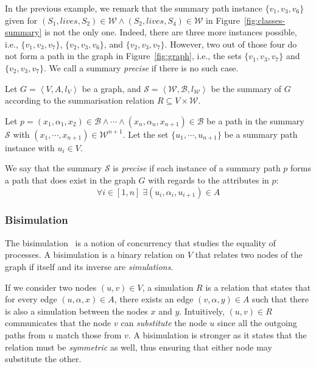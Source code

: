 In the previous example, we remark that the summary path instance $\{v_1, v_3, v_6\}$ given for $(S_1, lives, S_2) \in \mathcal{W} \wedge (S_2, lives, S_4) \in \mathcal{W}$ in Figure~\ref{fig:classes-summary} is not the only one. Indeed, there are three more instances possible, i.e., $\{v_1, v_3, v_7\}$, $\{v_2, v_3, v_6\}$, and $\{v_2, v_3, v_7\}$. However, two out of those four do not form a path in the graph in Figure~\ref{fig:graph}, i.e., the sets $\{v_1, v_3, v_7\}$ and $\{v_2, v_3, v_7\}$. We call a summary \emph{precise} if there is no such case.

\begin{definition}
\label{def:precise-summary}
Let $G=\left\langle V, A, l_V \right\rangle$ be a graph, and $\mathcal{S} = \left\langle \mathcal{W}, \mathcal{B}, l_{\mathcal{W}} \right\rangle$ be the summary of $G$ according to the summarisation relation $R \subseteq V \times \mathcal{W}$.

Let $p = (x_1, \alpha_1, x_2) \in \mathcal{B} \wedge \cdots \wedge (x_n, \alpha_n, x_{n+1}) \in \mathcal{B}$ be a path in the summary $\mathcal{S}$ with $(x_1, \cdots, x_{n+1}) \in \mathcal{W}^{n+1}$. Let the set $\{ u_1, \cdots, u_{n+1} \}$ be a summary path instance with $u_i \in V$.

We say that the summary $\mathcal{S}$ is \emph{precise} if each instance of a summary path $p$ forms a path that does exist in the graph $G$ with regards to the attributes in $p$:
$$
\forall i \in [1, n ]\; \exists \left(u_i, \alpha_i, u_{i+1} \right) \in A
$$
\end{definition}

\subsubsection{Bisimulation}
\label{chap:summary:bisim}

The bisimulation~\cite{park:1981:cai} is a notion of concurrency that studies the equality of processes.
A bisimulation is a binary relation on $V$ that relates two nodes of the graph if itself and its inverse are \emph{simulations}.

If we consider two nodes $(u, v) \in V$, a simulation $R$ is a relation that states that for every edge $(u, \alpha, x) \in A$, there exists an edge $(v,\alpha, y) \in A$ such that there is also a simulation between the nodes $x$ and $y$. Intuitively, $(u,v) \in R$ communicates that the node $v$ can \emph{substitute} the node $u$ since all the outgoing paths from $u$ match those from $v$. A bisimulation is stronger as it states that the relation must be \emph{symmetric} as well, thus ensuring that either node may substitute the other.

